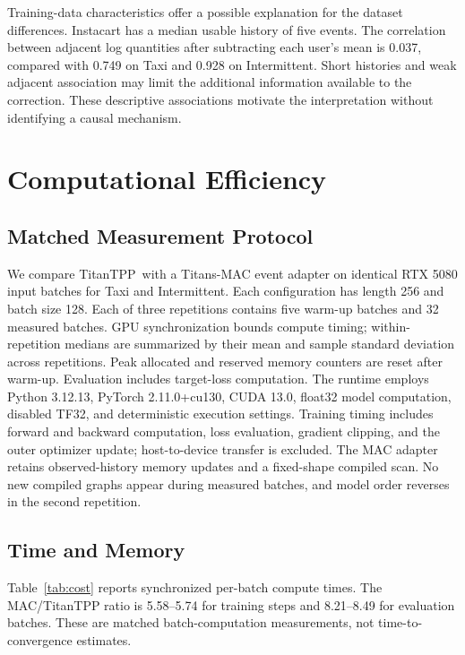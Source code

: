 \documentclass[runningheads]{llncs}
\newcommand{\method}{TitanTPP}
\begin{document}
Training-data characteristics offer a possible explanation for the dataset
differences. Instacart has a median usable history of five events. The
correlation between adjacent log quantities after subtracting each user's
mean is 0.037, compared with 0.749 on Taxi and 0.928 on Intermittent.
Short histories and weak adjacent association may limit the additional
information available to the correction. These descriptive associations
motivate the interpretation without identifying a causal mechanism.

\section{Computational Efficiency}
\subsection{Matched Measurement Protocol}
We compare \method\ with a Titans-MAC event adapter on identical RTX 5080
input batches for Taxi and Intermittent. Each configuration has length 256
and batch size 128. Each of three repetitions contains five warm-up batches
and 32 measured batches. GPU synchronization bounds compute timing;
within-repetition medians are summarized by their mean and sample standard
deviation across repetitions. Peak allocated and reserved memory counters
are reset after warm-up. Evaluation includes target-loss computation. The
runtime employs Python 3.12.13, PyTorch 2.11.0+cu130, CUDA 13.0, float32
model computation, disabled TF32, and deterministic execution settings.
Training timing includes forward and backward computation, loss evaluation,
gradient clipping, and the outer optimizer update; host-to-device transfer
is excluded. The MAC adapter retains observed-history memory updates and
a fixed-shape compiled scan. No new compiled graphs appear during measured
batches, and model order reverses in the second repetition.

\subsection{Time and Memory}
Table~\ref{tab:cost} reports synchronized per-batch compute times. The
MAC/TitanTPP ratio is 5.58--5.74 for training steps and 8.21--8.49 for
evaluation batches. These are matched batch-computation measurements, not
time-to-convergence estimates.
\end{document}
